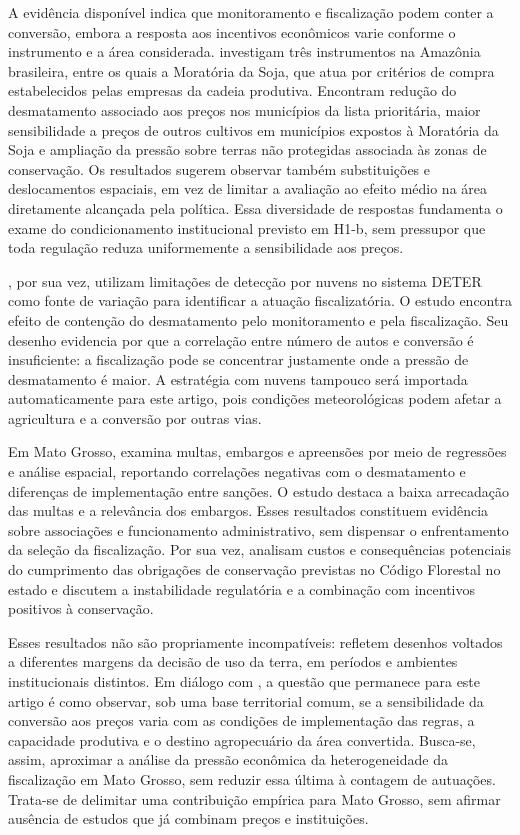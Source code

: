 A evidência disponível indica que monitoramento e fiscalização podem conter a conversão, embora a resposta aos incentivos econômicos varie conforme o instrumento e a área considerada.  investigam três instrumentos na Amazônia brasileira, entre os quais a Moratória da Soja, que atua por critérios de compra estabelecidos pelas empresas da cadeia produtiva. Encontram redução do desmatamento associado aos preços nos municípios da lista prioritária, maior sensibilidade a preços de outros cultivos em municípios expostos à Moratória da Soja e ampliação da pressão sobre terras não protegidas associada às zonas de conservação. Os resultados sugerem observar também substituições e deslocamentos espaciais, em vez de limitar a avaliação ao efeito médio na área diretamente alcançada pela política. Essa diversidade de respostas fundamenta o exame do condicionamento institucional previsto em H1-b, sem pressupor que toda regulação reduza uniformemente a sensibilidade aos preços.

, por sua vez, utilizam limitações de detecção por nuvens no sistema DETER como fonte de variação para identificar a atuação fiscalizatória. O estudo encontra efeito de contenção do desmatamento pelo monitoramento e pela fiscalização. Seu desenho evidencia por que a correlação entre número de autos e conversão é insuficiente: a fiscalização pode se concentrar justamente onde a pressão de desmatamento é maior. A estratégia com nuvens tampouco será importada automaticamente para este artigo, pois condições meteorológicas podem afetar a agricultura e a conversão por outras vias.

Em Mato Grosso,  examina multas, embargos e apreensões por meio de regressões e análise espacial, reportando correlações negativas com o desmatamento e diferenças de implementação entre sanções. O estudo destaca a baixa arrecadação das multas e a relevância dos embargos. Esses resultados constituem evidência sobre associações e funcionamento administrativo, sem dispensar o enfrentamento da seleção da fiscalização. Por sua vez,  analisam custos e consequências potenciais do cumprimento das obrigações de conservação previstas no Código Florestal no estado e discutem a instabilidade regulatória e a combinação com incentivos positivos à conservação.

Esses resultados não são propriamente incompatíveis: refletem desenhos voltados a diferentes margens da decisão de uso da terra, em períodos e ambientes institucionais distintos. Em diálogo com , a questão que permanece para este artigo é como observar, sob uma base territorial comum, se a sensibilidade da conversão aos preços varia com as condições de implementação das regras, a capacidade produtiva e o destino agropecuário da área convertida. Busca-se, assim, aproximar a análise da pressão econômica da heterogeneidade da fiscalização em Mato Grosso, sem reduzir essa última à contagem de autuações. Trata-se de delimitar uma contribuição empírica para Mato Grosso, sem afirmar ausência de estudos que já combinam preços e instituições.

